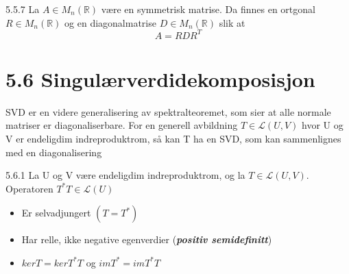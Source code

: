 \documentclass[a4paper,norsk]{article}
\begin{document}
\begin{corollarybox}{5.5.7}{}
La $ A \in M_n ( \mathbb{R}) $ være en symmetrisk matrise. Da finnes en ortgonal $ R \in M_n( \mathbb{R}) $ og en diagonalmatrise $ D \in M_n( \mathbb{R}) $ slik at 
\[
    A = RDR^T
\]
\end{corollarybox}

\section*{5.6 Singulærverdidekomposisjon}

SVD er en videre generalisering av spektralteoremet, som sier at alle normale matriser er diagonaliserbare. For en generell avbildning $ T \in \mathcal{L}(U, V) $ hvor U og V er endeligdim indreproduktrom, så kan T ha en SVD, som kan sammenlignes med en diagonalisering


\begin{lemmabox}{5.6.1}{}
    La U og V være endeligdim indreproduktrom, og la $ T \in \mathcal{L}(U, V) $. Operatoren $ T^*T \in \mathcal{L}(U) $
    
    \begin{itemize}
        \item Er selvadjungert $ \left( T = T^* \right)  $ 
        \item Har relle, ikke negative egenverdier (\textbf{\textit{positiv semidefinitt}})
        \item $ kerT = ker T^*T $ og $ imT^* = imT^*T $  
    \end{itemize}
\end{lemmabox}
\end{document}
